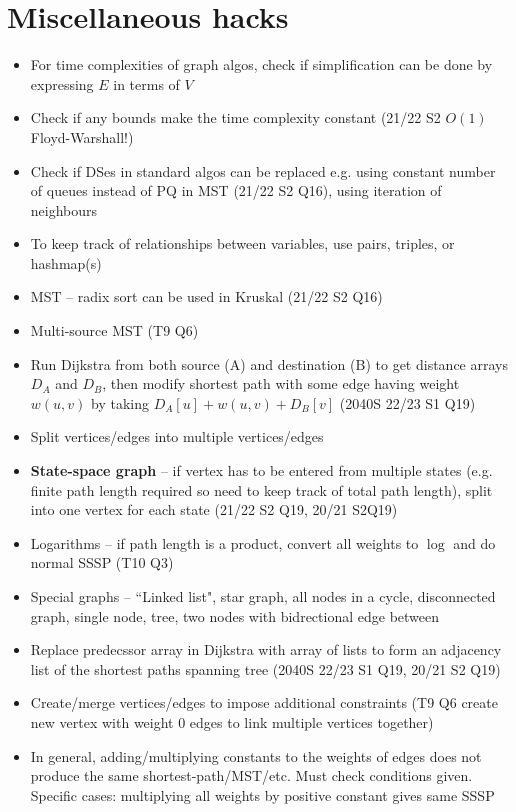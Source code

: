 \documentclass[frenchspacing,12pt,a4paper]{article}
\theoremstyle{remark}
\begin{document}
\section{Miscellaneous hacks}
\begin{itemize}
	\item For time complexities of graph algos, check if simplification can be done by expressing $E$ in terms of  $V$
	\item Check if any bounds make the time complexity constant (21/22 S2 $O(1)$ Floyd-Warshall!)
	\item Check if DSes in standard algos can be replaced e.g. using constant number of queues instead of PQ in MST (21/22 S2 Q16), using iteration of neighbours
	\item To keep track of relationships between variables, use pairs, triples, or hashmap(s)
	\item MST -- radix sort can be used in Kruskal (21/22 S2 Q16)
	\item Multi-source MST (T9 Q6)
	\item Run Dijkstra from both source (A) and destination (B) to get distance arrays $D_A$ and  $D_B$, then modify shortest path with some edge having weight $w(u,v)$ by taking $D_A[u]+w(u,v)+D_B[v]$ (2040S 22/23 S1 Q19)
	\item Split vertices/edges into multiple vertices/edges
	\item \textbf{State-space graph} -- if vertex has to be entered from multiple states (e.g. finite path length required so need to keep track of total path length), split into one vertex for each state (21/22 S2 Q19, 20/21 S2Q19)
	\item Logarithms -- if path length is a product, convert all weights to $\log$ and do normal SSSP (T10 Q3)
	\item Special graphs -- ``Linked list", star graph, all nodes in a cycle, disconnected graph, single node, tree, two nodes with bidrectional edge between
	\item Replace predecssor array in Dijkstra with array of lists to form an adjacency list of the shortest paths spanning tree (2040S 22/23 S1 Q19, 20/21 S2 Q19)
	\item Create/merge vertices/edges to impose additional constraints (T9 Q6 create new vertex with weight 0 edges to link multiple vertices together)
	\item In general, adding/multiplying constants to the weights of edges does not produce the same shortest-path/MST/etc. Must check conditions given. Specific cases: multiplying all weights by positive constant gives same SSSP
\end{itemize}
\end{document}
